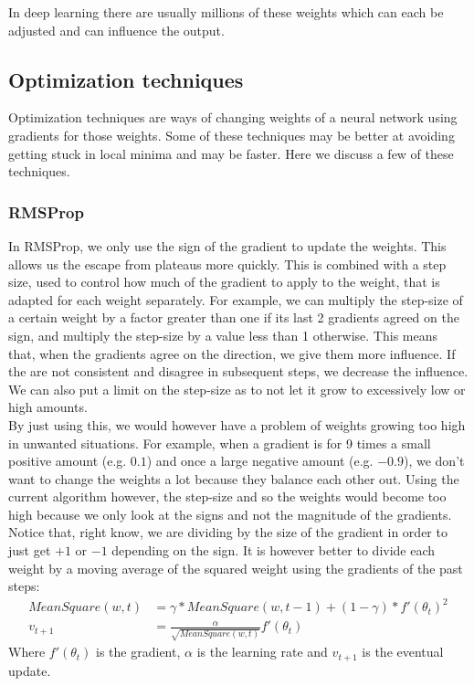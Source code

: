 \documentclass[a4paper]{article}
\begin{document}
In deep learning there are usually millions of these weights which can each be adjusted and can influence the output.

\subsection{Optimization techniques}
Optimization techniques are ways of changing weights of a neural network using gradients for those weights. Some of these techniques may be better at avoiding getting stuck in local minima and may be faster. Here we discuss a few of these techniques.

\subsubsection{RMSProp}

In RMSProp, we only use the sign of the gradient to update the weights. This allows us the escape from plateaus more quickly. This is combined with a step size, used to control how much of the gradient to apply to the weight, that is adapted for each weight separately. For example, we can multiply the step-size of a certain weight by a factor greater than one if its last 2 gradients agreed on the sign, and multiply the step-size by a value less than 1 otherwise. This means that, when the gradients agree on the direction, we give them more influence. If the are not consistent and disagree in subsequent steps, we decrease the influence. We can also put a limit on the step-size as to not let it grow to excessively low or high amounts.\\
By just using this, we would however have a problem of weights growing too high in unwanted situations. For example, when a gradient is for 9 times a small positive amount (e.g. $0.1$) and once a large negative amount (e.g. $-0.9$), we don't want to change the weights a lot because they balance each other out. Using the current algorithm however, the step-size and so the weights would become too high because we only look at the signs and not the magnitude of the gradients.\\
Notice that, right know, we are dividing by the size of the gradient in order to just get $+1$ or $-1$ depending on the sign. It is however better to divide each weight by a moving average of the squared weight using the gradients of the past steps:
\begin{align}
MeanSquare(w, t) &= \gamma * MeanSquare(w, t-1) + (1 - \gamma) * f'(\theta_t)^2 \\
v_{t+1} &= \frac{\alpha}{\sqrt{MeanSquare(w,t)}}f'(\theta_t)
\end{align}
Where $f'(\theta_t)$ is the gradient, $\alpha$ is the learning rate and $v_{t+1}$ is the eventual update.
\end{document}
